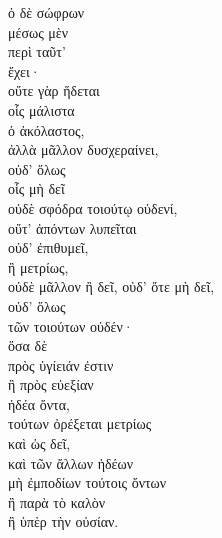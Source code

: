 {\large
\begin{greek}
\noindent  ὁ δὲ σώφρων \\
μέσως μὲν \\
\tabto{2em} περὶ ταῦτ' \\
ἔχει· \\
\tabto{2em} οὔτε γὰρ ἥδεται \\
\tabto{4em} οἷς μάλιστα \\
\tabto{2em} ὁ ἀκόλαστος, \\
\tabto{4em} ἀλλὰ μᾶλλον δυσχεραίνει, \\
\tabto{2em} οὐδ' ὅλως \\
\tabto{4em} οἷς μὴ δεῖ \\

\tabto{2em} οὐδὲ σφόδρα τοιούτῳ οὐδενί, \\
\tabto{4em} οὔτ' ἀπόντων λυπεῖται \\
\tabto{4em} οὐδ' ἐπιθυμεῖ, \\
\tabto{2em} ἢ μετρίως, \\
\tabto{4em} οὐδὲ μᾶλλον ἢ δεῖ,
\tabto{4em} οὐδ' ὅτε μὴ δεῖ, \\
\tabto{4em} οὐδ' ὅλως \\
\tabto{6em} τῶν τοιούτων οὐδέν· \\
ὅσα δὲ \\
\tabto{2em} πρὸς ὑγίειάν ἐστιν \\
\tabto{2em} ἢ πρὸς εὐεξίαν \\
ἡδέα ὄντα, \\
\tabto{2em} τούτων ὀρέξεται μετρίως \\
\tabto{4em} καὶ ὡς δεῖ, \\
\tabto{2em} καὶ τῶν ἄλλων ἡδέων \\
\tabto{4em} μὴ ἐμποδίων τούτοις ὄντων \\
\tabto{6em} ἢ παρὰ τὸ καλὸν \\
\tabto{6em} ἢ ὑπὲρ τὴν οὐσίαν. \\

\end{greek}
}

